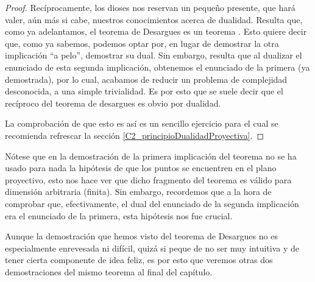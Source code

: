 \begin{proof}
	Recíprocamente, los dioses nos reservan un pequeño presente, que hará valer, aún más si cabe, nuestros conocimientos acerca de dualidad. Resulta que, como ya adelantamos, el teorema de Desargues es un teorema . Esto quiere decir que, como ya sabemos, podemos optar por, en lugar de demostrar la otra implicación ``a pelo'', demostrar su dual. Sin embargo, resulta que al dualizar el enunciado de esta segunda implicación, obtenemos el enunciado de la primera (ya demostrada), por lo cual, acabamos de reducir un problema de complejidad desconocida, a una simple trivialidad. Es por esto que se suele decir que el recíproco del teorema de desargues es obvio por dualidad.
	
	La comprobación de que esto es así es un sencillo ejercicio para el cual se recomienda refrescar la sección \ref{C2_principioDualidadProyectiva}.
\end{proof}
Nótese que en la demostración de la primera implicación del teorema no se ha usado para nada la hipótesis de que los puntos se encuentren en el plano proyectivo, esto nos hace ver que dicho fragmento del teorema es válido para dimensión arbitraria (finita). Sin embargo, recordemos que a la hora de comprobar que, efectivamente, el dual del enunciado de la segunda implicación era el enunciado de la primera, esta hipótesis nos fue crucial.

Aunque la demostración que hemos visto del teorema de Desargues no es especialmente enrevesada ni difícil, quizá si peque de no ser muy intuitiva y de tener cierta componente de idea feliz, es por esto que veremos otras dos demostraciones del mismo teorema al final del capítulo.
